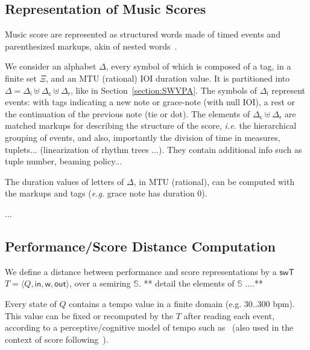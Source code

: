 \documentclass[runningheads]{llncs}
\def\ie{\textit{i.e.}\xspace}
\def\eg{\textit{e.g.}\xspace}
\def\<#1>{\langle #1 \rangle}
\newcommand{\Semiring}{\mathbb{S}}
\def\SWT{\textsf{swT}\xspace}
\def\wei{\mathsf{w}}
\def\init{\mathsf{in}}
\def\final{\mathsf{out}}
\def\Deltai{{\Delta_\mathsf{i}}}
\def\Deltac{{\Delta_\mathsf{c}}}
\def\Deltar{{\Delta_\mathsf{r}}}
\begin{document}
\subsection{Representation of Music Scores}
Music score are represented as structured words
made of timed %
events and parenthesized markups,
akin of nested words~\cite{AlurMadhusudan09nested}.

We consider an alphabet $\Delta$, every symbol of which is 
composed of a tag, in a finite set $\Xi$, 
and an MTU (rational) IOI duration value.
It is partitioned into 
$\Delta = \Deltai \uplus \Deltac \uplus \Deltar$, 
like in Section~\ref{section:SWVPA}.
%
\noindent
The symbols of $\Deltai$ represent events:
with tags indicating a new note or grace-note (with null IOI), 
a rest or the continuation of the previous note (tie or dot).
%
The elements of $\Deltac \uplus \Deltar$ are matched
markups for describing the structure of the score, 
\ie the hierarchical grouping of events, and also, 
importantly the division of time in measures, tuplets...
(linearization of rhythm trees \cite{jacquemard:hal-01138642}...).
They contain additional info such as tuple number, beaming policy...

\noindent
The duration values of letters of $\Delta$, in MTU (rational), 
can be computed with the markups and tags (\eg grace note has duration 0).

%

\begin{example}
...      
\end{example}

\subsection{Performance/Score Distance Computation}
\label{app:distance}
We define a distance between performance and score representations
by a $\SWT$ $T = \< Q, \init, \wei, \final >$, over a semiring $\Semiring$.
** detail the elements of $\Semiring$ ....**

Every state of $Q$ contains a 
tempo value in a finite domain (e.g. 30..300 bpm).
This value can be fixed 
or recomputed by the $T$ %
after reading each event, 
according to a perceptive/cognitive model of tempo 
such as~\cite{LargeJones99tempo}
(also used in the context of score following~\cite{Cont10TPAMI}).
\end{document}
